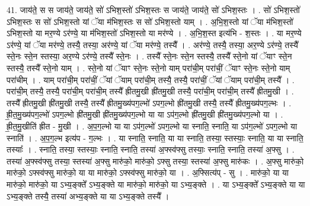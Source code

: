 \documentclass[17pt]{extarticle}
\begin{document}
41. जाय॑ते॒ स स जाय॑ते॒ जाय॑ते॒ सो॑ ऽभिश॒स्तो॑ ऽभिश॒स्तः स जाय॑ते॒ जाय॑ते॒ सो॑ ऽभिश॒स्तः । . सो॑ ऽभिश॒स्तो॑ ऽभिश॒स्तः स सो॑ ऽभिश॒स्तो यां ॅया म॑भिश॒स्तः स सो॑ ऽभिश॒स्तो याम् । . अ॒भि॒श॒स्तो यां ॅया म॑भिश॒स्तो॑ ऽभिश॒स्तो या मर॒ण्ये ऽर॑ण्ये॒ या म॑भिश॒स्तो॑ ऽभिश॒स्तो या मर॑ण्ये । . अ॒भि॒श॒स्त इत्य॑भि - श॒स्तः । . या मर॒ण्ये ऽर॑ण्ये॒ यां ॅया मर॑ण्ये॒ तस्यै॒ तस्या॒ अर॑ण्ये॒ यां ॅया मर॑ण्ये॒ तस्यै᳚ । . अर॑ण्ये॒ तस्यै॒ तस्या॒ अर॒ण्ये ऽर॑ण्ये॒ तस्यै᳚ स्ते॒नः स्ते॒न स्तस्या॒ अर॒ण्ये ऽर॑ण्ये॒ तस्यै᳚ स्ते॒नः । . तस्यै᳚ स्ते॒नः स्ते॒न स्तस्यै॒ तस्यै᳚ स्ते॒नो यां ॅयाꣳ स्ते॒न स्तस्यै॒ तस्यै᳚ स्ते॒नो याम् । . स्ते॒नो यां ॅयाꣳ स्ते॒नः स्ते॒नो याम् परा॑ची॒म् परा॑चीं॒ ॅयाꣳ स्ते॒नः स्ते॒नो याम् परा॑चीम् । . याम् परा॑ची॒म् परा॑चीं॒ ॅयां ॅयाम् परा॑ची॒म् तस्यै॒ तस्यै॒ परा॑चीं॒ ॅयां ॅयाम् परा॑ची॒म् तस्यै᳚ । . परा॑ची॒म् तस्यै॒ तस्यै॒ परा॑ची॒म् परा॑ची॒म् तस्यै᳚ ह्रीतमु॒खी ह्री॑तमु॒खी तस्यै॒ परा॑ची॒म् परा॑ची॒म् तस्यै᳚ ह्रीतमु॒खी । . तस्यै᳚ ह्रीतमु॒खी ह्री॑तमु॒खी तस्यै॒ तस्यै᳚ ह्रीतमु॒ख्य॑पग॒ल्भो॑ ऽपग॒ल्भो ह्री॑तमु॒खी तस्यै॒ तस्यै᳚ ह्रीतमु॒ख्य॑पग॒ल्भः । . ह्री॒त॒मु॒ख्य॑पग॒ल्भो॑ ऽपग॒ल्भो ह्री॑तमु॒खी ह्री॑तमु॒ख्य॑पग॒ल्भो या या ऽप॑ग॒ल्भो ह्री॑तमु॒खी ह्री॑तमु॒ख्य॑पग॒ल्भो या । . ह्री॒त॒मु॒खीति॑ ह्रीत - मु॒खी । . अ॒प॒ग॒ल्भो या या ऽप॑ग॒ल्भो॑ ऽपग॒ल्भो या स्नाति॒ स्नाति॒ या ऽप॑ग॒ल्भो॑ ऽपग॒ल्भो या स्नाति॑ । . अ॒प॒ग॒ल्भ इत्य॑प - ग॒ल्भः । . या स्नाति॒ स्नाति॒ या या स्नाति॒ तस्या॒ स्तस्याः॒ स्नाति॒ या या स्नाति॒ तस्याः᳚ । . स्नाति॒ तस्या॒ स्तस्याः॒ स्नाति॒ स्नाति॒ तस्या॑ अ॒फ्स्व॑फ्सु तस्याः॒ स्नाति॒ स्नाति॒ तस्या॑ अ॒फ्सु । . तस्या॑ अ॒फ्स्व॑फ्सु तस्या॒ स्तस्या॑ अ॒फ्सु मारु॑को॒ मारु॑को॒ ऽफ्सु तस्या॒ स्तस्या॑ अ॒फ्सु मारु॑कः । . अ॒फ्सु मारु॑को॒ मारु॑को॒ ऽफ्स्व॑फ्सु मारु॑को॒ या या मारु॑को॒ ऽफ्स्व॑फ्सु मारु॑को॒ या । . अ॒फ्सित्य॑प् - सु । . मारु॑को॒ या या मारु॑को॒ मारु॑को॒ या ऽभ्य॒ङ्क्ते᳚ ऽभ्य॒ङ्क्ते या मारु॑को॒ मारु॑को॒ या ऽभ्य॒ङ्क्ते । . या ऽभ्य॒ङ्क्ते᳚ ऽभ्य॒ङ्क्ते या या ऽभ्य॒ङ्क्ते तस्यै॒ तस्या॑ अभ्य॒ङ्क्ते या या ऽभ्य॒ङ्क्ते तस्यै᳚ । \newline
\pagebreak
{}
\end{document}
